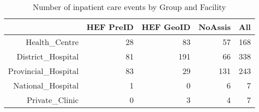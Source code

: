 \begin{table}[ht]
\centering
\begin{tabular}{rrrrr}
  \hline
 & HEF PreID & HEF GeoID & NoAssis & All \\ 
  \hline
Health\_Centre &  28 &  83 &  57 & 168 \\ 
  District\_Hospital &  81 & 191 &  66 & 338 \\ 
  Provincial\_Hospital &  83 &  29 & 131 & 243 \\ 
  National\_Hospital &   1 &   0 &   6 &   7 \\ 
  Private\_Clinic &   0 &   3 &   4 &   7 \\ 
   \hline
\end{tabular}
\caption{Number of inpatient care events by Group and Facility} 
\end{table}

